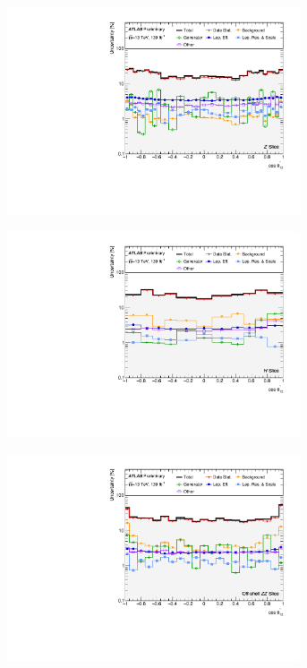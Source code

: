 \begin{figure}[hp]
    \centering
    \begin{subfigure}{.49\textwidth}\centering\includegraphics[width = 0.95\textwidth]{Figures/m4l/Systematics/Unfolded/UnfoldedSys_CTS12_vs_M4l_Stack_Paper0.pdf}\end{subfigure}
    \begin{subfigure}{.49\textwidth}\centering\includegraphics[width = 0.95\textwidth]{Figures/m4l/Systematics/Unfolded/UnfoldedSys_CTS12_vs_M4l_Stack_Paper1.pdf}\end{subfigure}
    \begin{subfigure}{.49\textwidth}\centering\includegraphics[width = 0.95\textwidth]{Figures/m4l/Systematics/Unfolded/UnfoldedSys_CTS12_vs_M4l_Stack_Paper2.pdf}\end{subfigure}

\end{figure}
